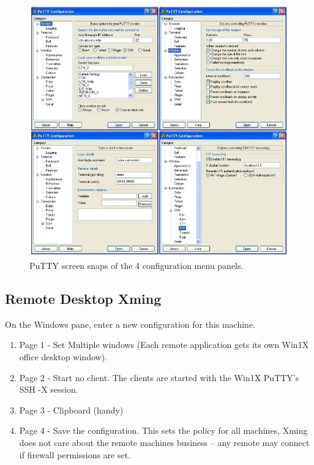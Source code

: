 \begin{figure}[h!]
\centering
\includegraphics[width=.7\textwidth]{images/PuYYTXming.png}
\caption{PuTTY screen snaps of the 4 configuration menu panels.} %
\label{figure:}
\end{figure}



\newpage
\subsection{Remote Desktop Xming}


On the Windows pane, enter a new configuration for this machine.

\vspace{-.15cm}
\begin{enumerate}\addtolength{\itemsep}{-0.5\baselineskip}
   \item Page 1 - Set Multiple windows (Each remote application gets
     its own Win1X office desktop window).
   \item Page 2 - Start no client. The clients are started with the
     Win1X PuTTY's SSH -X session.
   \item  Page 3 - Clipboard (handy)
   \item Page 4 - Save the configuration. This sets the policy for all
     machines, Xming does not care about the remote machines business
     -- any remote may connect if firewall permissions are set.
\end{enumerate}


